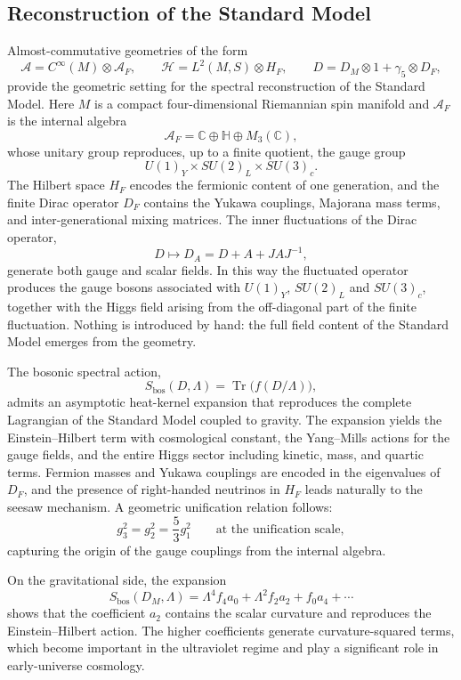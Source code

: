 \documentclass[11pt]{article}
\theoremstyle{plain}
\begin{document}
\subsection{Reconstruction of the Standard Model}

Almost-commutative geometries of the form
\[
\mathcal{A}=C^{\infty}(M)\otimes \mathcal{A}_{F}, \qquad
\mathcal{H}=L^{2}(M,S)\otimes H_{F}, \qquad
D = D_{M}\otimes 1+\gamma_{5}\otimes D_{F},
\]
provide the geometric setting for the spectral reconstruction of the Standard
Model.  Here $M$ is a compact four-dimensional Riemannian spin manifold and
$\mathcal{A}_{F}$ is the internal algebra
\[
\mathcal{A}_{F}
  = \mathbb{C} \oplus \mathbb{H} \oplus M_{3}(\mathbb{C}),
\]
whose unitary group reproduces, up to a finite quotient, the gauge group
\[
U(1)_{Y}\times SU(2)_{L}\times SU(3)_{c}.
\]
The Hilbert space $H_{F}$ encodes the fermionic content of one generation, and
the finite Dirac operator $D_{F}$ contains the Yukawa couplings, Majorana mass
terms, and inter-generational mixing matrices.  The inner fluctuations of the
Dirac operator,
\[
D \mapsto D_{A}=D+A+JAJ^{-1},
\]
generate both gauge and scalar fields.  In this way the fluctuated operator
produces the gauge bosons associated with $U(1)_{Y}$, $SU(2)_{L}$ and
$SU(3)_{c}$, together with the Higgs field arising from the off-diagonal part of
the finite fluctuation.  Nothing is introduced by hand: the full field content
of the Standard Model emerges from the geometry.

The bosonic spectral action,
\[
S_{\mathrm{bos}}(D,\Lambda)=\operatorname{Tr}\bigl(f(D/\Lambda)\bigr),
\]
admits an asymptotic heat-kernel expansion that reproduces the complete
Lagrangian of the Standard Model coupled to gravity.  The expansion yields the
Einstein--Hilbert term with cosmological constant, the Yang--Mills actions for
the gauge fields, and the entire Higgs sector including kinetic, mass, and
quartic terms.  Fermion masses and Yukawa couplings are encoded in the
eigenvalues of $D_{F}$, and the presence of right-handed neutrinos in $H_{F}$
leads naturally to the seesaw mechanism.  A geometric unification relation
follows:
\[
g_{3}^{2}=g_{2}^{2}=\frac{5}{3}g_{1}^{2}
\qquad \text{at the unification scale},
\]
capturing the origin of the gauge couplings from the internal algebra.

On the gravitational side, the expansion
\[
S_{\mathrm{bos}}(D_{M},\Lambda)
=\Lambda^{4}f_{4}a_{0}
+ \Lambda^{2}f_{2}a_{2}
+ f_{0}a_{4}
+ \cdots
\]
shows that the coefficient $a_{2}$ contains the scalar curvature and reproduces
the Einstein--Hilbert action.  The higher coefficients generate
curvature-squared terms, which become important in the ultraviolet regime and
play a significant role in early-universe cosmology.
\end{document}
